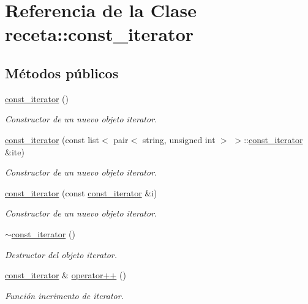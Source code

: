 \hypertarget{classreceta_1_1const__iterator}{}\section{Referencia de la Clase receta\+:\+:const\+\_\+iterator}
\label{classreceta_1_1const__iterator}
\subsection*{Métodos públicos}
\begin{DoxyCompactItemize}
\item 
\hyperlink{classreceta_1_1const__iterator_aa31dafb4cc1e54d2ceef5b9575afaeb0}{const\+\_\+iterator} ()
\begin{DoxyCompactList}\small\item\em Constructor de un nuevo objeto iterator. \end{DoxyCompactList}\item 
\hyperlink{classreceta_1_1const__iterator_a057507cdac42e1a1cd940667bd3b6239}{const\+\_\+iterator} (const list$<$ pair$<$ string, unsigned int $>$ $>$\+::\hyperlink{classreceta_1_1const__iterator}{const\+\_\+iterator} \&ite)
\begin{DoxyCompactList}\small\item\em Constructor de un nuevo objeto iterator. \end{DoxyCompactList}\item 
\hyperlink{classreceta_1_1const__iterator_adf7052a9c620f7120d7d56c64985a932}{const\+\_\+iterator} (const \hyperlink{classreceta_1_1const__iterator}{const\+\_\+iterator} \&i)
\begin{DoxyCompactList}\small\item\em Constructor de un nuevo objeto iterator. \end{DoxyCompactList}\item 
\hyperlink{classreceta_1_1const__iterator_a7533f928c728561f182dc98ac9e049a5}{$\sim$const\+\_\+iterator} ()
\begin{DoxyCompactList}\small\item\em Destructor del objeto iterator. \end{DoxyCompactList}\item 
\hyperlink{classreceta_1_1const__iterator}{const\+\_\+iterator} \& \hyperlink{classreceta_1_1const__iterator_a83cee4f2729a04af846cf05f8b688f59}{operator++} ()
\begin{DoxyCompactList}\small\item\em Función incrimento de iterator. \end{DoxyCompactList}\item 

\end{DoxyCompactItemize}

